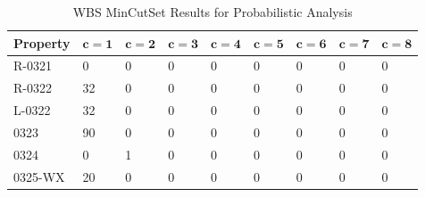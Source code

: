 \begin{center}
\begin{table}[htbp]
    \begin{tabular}{ | l | l | l | l | l | l | l | l | l |}
    \hline
    \textbf{Property} & $\bm{c = 1}$ & $\bm{c = 2}$ & $\bm{c = 3}$ & $\bm{c = 4}$ 
		& $\bm{c = 5}$ & $\bm{c = 6}$ & $\bm{c = 7}$ & $\bm{c = 8}$  \\ \hline \hline
    R-0321 & 0 & 0 & 0 & 0 & 0 & 0 & 0 & 0 \\ \hline
    R-0322 & 32 & 0 & 0 &0 &0 &0 &0& 0  \\ \hline
    L-0322 & 32 & 0 & 0 & 0 & 0 & 0 & 0 & 0  \\ \hline
    0323 & 90 & 0 & 0 & 0 & 0 & 0 & 0 & 0  \\ \hline
    0324 & 0 & 1 & 0 & 0 & 0 & 0 & 0 & 0  \\ \hline
    0325-WX & 20 & 0 & 0 &0 &0 & 0 & 0 & 0  \\ \hline
    \end{tabular}
    \caption{WBS MinCutSet Results for Probabilistic Analysis}
    \label{tab:wbs_prob_results}
\end{table}
\end{center}

